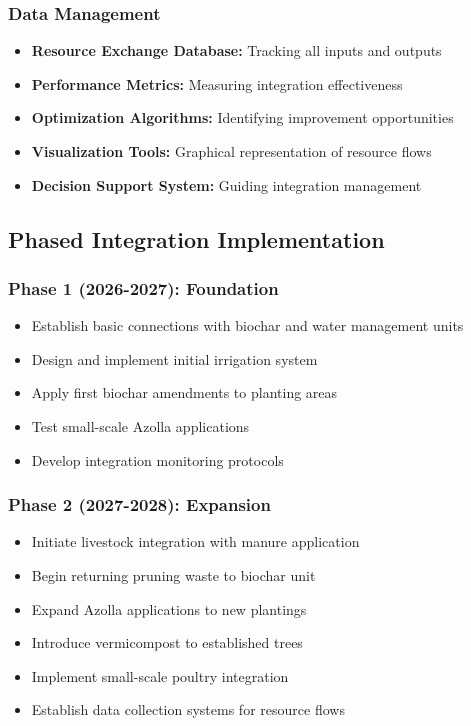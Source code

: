 \subsubsection{Data Management}
\begin{itemize}
    \item \textbf{Resource Exchange Database:} Tracking all inputs and outputs
    \item \textbf{Performance Metrics:} Measuring integration effectiveness
    \item \textbf{Optimization Algorithms:} Identifying improvement opportunities
    \item \textbf{Visualization Tools:} Graphical representation of resource flows
    \item \textbf{Decision Support System:} Guiding integration management
\end{itemize}

\subsection{Phased Integration Implementation}

\subsubsection{Phase 1 (2026-2027): Foundation}
\begin{itemize}
    \item Establish basic connections with biochar and water management units
    \item Design and implement initial irrigation system
    \item Apply first biochar amendments to planting areas
    \item Test small-scale Azolla applications
    \item Develop integration monitoring protocols
\end{itemize}

\subsubsection{Phase 2 (2027-2028): Expansion}
\begin{itemize}
    \item Initiate livestock integration with manure application
    \item Begin returning pruning waste to biochar unit
    \item Expand Azolla applications to new plantings
    \item Introduce vermicompost to established trees
    \item Implement small-scale poultry integration
    \item Establish data collection systems for resource flows
\end{itemize}

